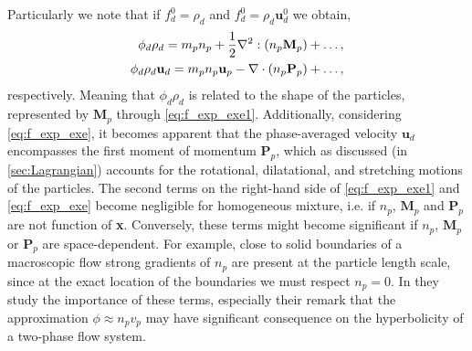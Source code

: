 Particularly we note that if $f_d^0 = \rho_d$ and $f_d^0 = \rho_d \textbf{u}_d^0$ we obtain, 
\begin{align}
    \label{eq:f_exp_exe1}
    \phi_d \rho_d
    = m_p n_p 
    + \frac{1}{2}\mathbf{\nabla}^2 : (n_p\textbf{M}_p)+\ldots,\\
    \phi_d \rho_d \textbf{u}_d
    = m_p n_p \textbf{u}_p 
    - \mathbf{\nabla}\cdot (n_p\textbf{P}_p)+\ldots,
    \label{eq:f_exp_exe}
\end{align}
respectively. 
Meaning that $\phi_d\rho_d$ is related to the shape of the particles, represented by $\textbf{M}_p$ through \ref{eq:f_exp_exe1}.
Additionally, considering \ref{eq:f_exp_exe}, it becomes apparent that the phase-averaged velocity $\textbf{u}_d$ encompasses the first moment of momentum $\textbf{P}_p$, which as discussed (in \ref{sec:Lagrangian}) accounts for the rotational, dilatational, and stretching motions of the particles. 
The second terms on the right-hand side of \ref{eq:f_exp_exe1} and \ref{eq:f_exp_exe} become negligible for homogeneous mixture, i.e. if $n_p$, $\textbf{M}_p$ and $\textbf{P}_p$ are not function of \textbf{x}. 
Conversely, these terms might become significant if $n_p$, $\textbf{M}_p$ or $\textbf{P}_p$ are space-dependent.
For example, close to solid boundaries of a macroscopic flow strong gradients of $n_p$ are present at the particle length scale, since at the exact location of the boundaries we must respect $n_p = 0$. 
In \cite{prosperetti1995finite} they study the importance of these terms, especially their remark that the approximation $\phi \approx n_p v_p$ may have significant consequence on the hyperbolicity of a two-phase flow system. 

